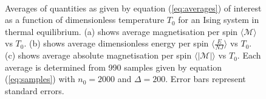 \documentclass[11pt]{iopart}
\begin{document}
\begin{figure}[t]
    \centering
    \quad
     \
          \
 
    \caption{Averages of quantities as given by equation (\ref{eq:averages}) of interest as a function of dimensionless temperature $T_0$ for an Ising system in thermal equilibrium. (a) shows average magnetisation per spin $\langle\mathcal{M}\rangle$ vs $T_0$. (b) shows average dimensionless energy per spin $\langle\frac{E}{NJ}\rangle$ vs $T_0$. (c) shows average absolute magnetisation per spin $\langle|\mathcal{M}|\rangle$ vs $T_0$. Each average is determined from 990 samples given by equation (\ref{eq:samples}) with $n_0 = 2000$ and $\Delta = 200$. Error bars represent standard errors.}
    \label{fig:equilibriumaverages}
\end{figure}
\end{document}
